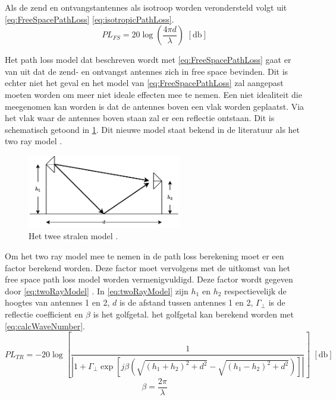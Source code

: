 Als de zend en ontvangstantennes als isotroop worden verondersteld volgt uit \cref{eq:FreeSpacePathLoss} \cref{eq:isotropicPathLoss}.
\begin{equation} \label{eq:isotropicPathLoss}
    PL_{FS}=20\log\left(\frac{4\pi d}{\lambda}\right) \,\,\left[\unit{\decibel}\right]
\end{equation}

Het path loss model dat beschreven wordt met \cref{eq:FreeSpacePathLoss} gaat er van uit dat de zend- en ontvangst antennes zich in free space bevinden. Dit is echter niet het geval en het model van \cref{eq:FreeSpacePathLoss} zal aangepast moeten worden om meer niet ideale effecten mee te nemen. Een niet idealiteit die meegenomen kan worden is dat de antennes boven een vlak worden geplaatst. Via het vlak waar de antennes boven staan zal er een reflectie ontstaan. Dit is schematisch getoond in \cref{fig:twoRayModelSchem}. Dit nieuwe model staat bekend in de literatuur als het two ray model \cite{MobileAntenaSystemsHandbookCH2}.
\begin{figure}[h]
    \centering
    \includegraphics[width=0.6\textwidth]{img/twoRayModel}
    \caption{Het twee stralen model \cite{MobileAntenaSystemsHandbookCH2}.}
    \label{fig:twoRayModelSchem}
\end{figure}

Om het two ray model mee te nemen in de path loss berekening moet er een factor berekend worden. Deze factor moet vervolgens met de uitkomst van het free space path loss model worden vermenigvuldigd. Deze factor wordt gegeven door \cref{eq:twoRayModel} \cite{MobileAntenaSystemsHandbookCH2,brini2019system}. In \cref{eq:twoRayModel} zijn $h_1$ en $h_2$ respectievelijk de hoogtes van antennes 1 en 2, $d$ is de afstand tussen antennes 1 en 2, $\Gamma_\bot$ is de reflectie coefficient en $\beta$ is het golfgetal. het golfgetal kan berekend worden met \cref{eq:calcWaveNumber}. 
\begin{equation}\label{eq:twoRayModel}
    PL_{TR}=-20\log\left[\frac{1}{\left|1+\Gamma_\bot\exp\left[j\beta \left(\sqrt{\left(h_1+h_2\right)^2+d^2}-\sqrt{\left(h_1-h_2\right)^2+d^2}\right)\right]\right|}\right] \,\,\left[\unit{\decibel}\right]
\end{equation}
\begin{equation}\label{eq:calcWaveNumber}
    \beta=\frac{2\pi}{\lambda}
\end{equation}

